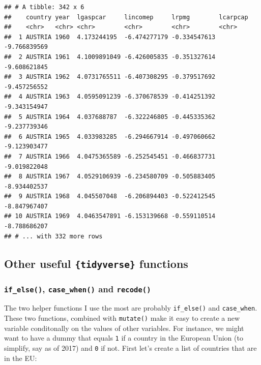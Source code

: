 \documentclass[]{gitbook}
\newenvironment{Shaded}{\begin{snugshade}}{\end{snugshade}}
\newcommand{\KeywordTok}[1]{\textcolor[rgb]{0.13,0.29,0.53}{\textbf{#1}}}
\newcommand{\NormalTok}[1]{#1}
\newcommand{\OperatorTok}[1]{\textcolor[rgb]{0.81,0.36,0.00}{\textbf{#1}}}
\newcommand{\StringTok}[1]{\textcolor[rgb]{0.31,0.60,0.02}{#1}}
\theoremstyle{definition}
\theoremstyle{definition}
\theoremstyle{definition}
\theoremstyle{remark}
\begin{document}
\begin{Shaded}
\end{Shaded}

\begin{verbatim}
## # A tibble: 342 x 6
##    country year  lgaspcar     lincomep     lrpmg        lcarpcap    
##    <chr>   <chr> <chr>        <chr>        <chr>        <chr>       
##  1 AUSTRIA 1960  4.173244195  -6.474277179 -0.334547613 -9.766839569
##  2 AUSTRIA 1961  4.1009891049 -6.426005835 -0.351327614 -9.608621845
##  3 AUSTRIA 1962  4.0731765511 -6.407308295 -0.379517692 -9.457256552
##  4 AUSTRIA 1963  4.0595091239 -6.370678539 -0.414251392 -9.343154947
##  5 AUSTRIA 1964  4.037688787  -6.322246805 -0.445335362 -9.237739346
##  6 AUSTRIA 1965  4.033983285  -6.294667914 -0.497060662 -9.123903477
##  7 AUSTRIA 1966  4.0475365589 -6.252545451 -0.466837731 -9.019822048
##  8 AUSTRIA 1967  4.0529106939 -6.234580709 -0.505883405 -8.934402537
##  9 AUSTRIA 1968  4.045507048  -6.206894403 -0.522412545 -8.847967407
## 10 AUSTRIA 1969  4.0463547891 -6.153139668 -0.559110514 -8.788686207
## # ... with 332 more rows
\end{verbatim}

\hypertarget{other-useful-tidyverse-functions}{%
\subsection{\texorpdfstring{Other useful \texttt{\{tidyverse\}}
functions}{Other useful \{tidyverse\} functions}}\label{other-useful-tidyverse-functions}}

\hypertarget{if_else-case_when-and-recode}{%
\subsubsection{\texorpdfstring{\texttt{if\_else()},
\texttt{case\_when()} and
\texttt{recode()}}{if\_else(), case\_when() and recode()}}\label{if_else-case_when-and-recode}}

The two helper functions I use the most are probably \texttt{if\_else()}
and \texttt{case\_when}. These two functions, combined with
\texttt{mutate()} make it easy to create a new variable conditonally on
the values of other variables. For instance, we might want to have a
dummy that equals \texttt{1} if a country in the European Union (to
simplify, say as of 2017) and \texttt{0} if not. First let's create a
list of countries that are in the EU:
\end{document}
